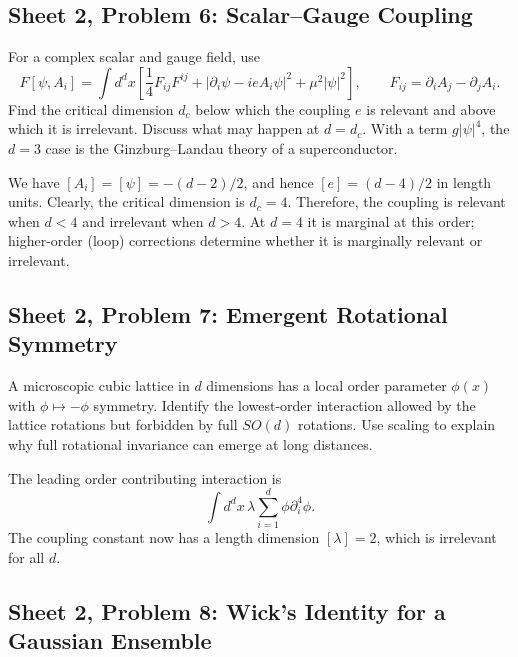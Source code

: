 \subsection{Sheet 2, Problem 6: Scalar--Gauge Coupling}

For a complex scalar and gauge field, use
\begin{equation}
    F[\psi,A_i]=\int d^dx\left[
    \frac14F_{ij}F^{ij}
    +|\partial_i\psi-ieA_i\psi|^2+\mu^2|\psi|^2\right],
    \qquad F_{ij}=\partial_iA_j-\partial_jA_i.
\end{equation}
Find the critical dimension $d_c$ below which the coupling $e$ is
relevant and above which it is irrelevant. Discuss what may happen
at $d=d_c$. With a term $g|\psi|^4$, the $d=3$ case is the
Ginzburg--Landau theory of a superconductor.

\begin{solution}
    We have $[A_i] = [\psi] = -(d-2)/2$, and hence $[e] = (d-4)/2$ in length units. Clearly, the critical dimension is $d_c = 4$. Therefore, the coupling is relevant when $d<4$ and irrelevant when $d>4$. At $d=4$ it is marginal at this order; higher-order (loop) corrections determine whether it is marginally relevant or irrelevant.
\end{solution}

\subsection{Sheet 2, Problem 7: Emergent Rotational Symmetry}

A microscopic cubic lattice in $d$ dimensions has a local order
parameter $\phi(x)$ with $\phi\mapsto-\phi$ symmetry. Identify the
lowest-order interaction allowed by the lattice rotations but forbidden
by full $SO(d)$ rotations. Use scaling to explain why full rotational
invariance can emerge at long distances.
\begin{solution}
    The leading order contributing interaction is
    \begin{equation}
        \int d^dx \,\lambda\sum_{i=1}^d\phi \partial _i^4 \phi.
    \end{equation}
    The coupling constant now has a length dimension $[\lambda] = 2$, which is irrelevant for all $d$.
\end{solution}

\subsection{Sheet 2, Problem 8: Wick's Identity for a Gaussian Ensemble}

